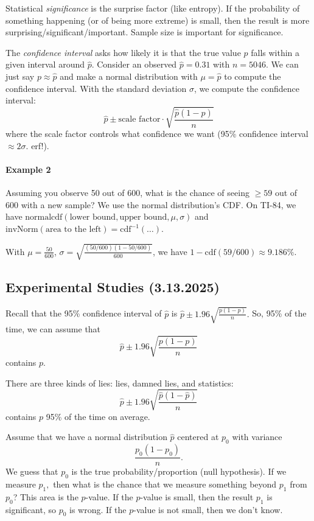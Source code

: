 \documentclass[12pt]{article}
\theoremstyle{remark}
\begin{document}
Statistical \emph{significance} is the surprise factor (like entropy). If the probability of something happening (or of being more extreme) is small, then the result is more surprising/significant/important. Sample size is important for significance.

The \emph{confidence interval} asks how likely it is that the true value $p$ falls within a given interval around $\hat p$. Consider an observed $\hat p = 0.31$ with $n=5046$. We can just say $p\approx \hat p$ and make a normal distribution with $\mu = \hat p$ to compute the confidence interval. With the standard deviation $\sigma$, we compute the confidence interval:
\[\hat p \pm \text{scale factor} \cdot \sqrt{\frac{\hat p (1 - \hat p )}{n}}\]
where the scale factor controls what confidence we want (95\% confidence interval $\approx 2\sigma$. erf!).


\paragraph{Example 2}
Assuming you observe 50 out of 600, what is the chance of seeing $\ge 59$ out of 600 with a new sample? We use the normal distribution's CDF. On TI-84, we have $\text{normalcdf}(\text{lower bound}, \text{upper bound}, \mu, \sigma)$ and $\text{invNorm}(\text{area to the left}) = \text{cdf}^{-1}(\dots)$.

With $\mu = \frac{50}{600}$, $\sigma = \sqrt{\frac{(50/600)(1-50/600)}{600}}$, we have $1-\text{cdf}(59/600) \approx \boxed{9.186\%}$.


\subsection{Experimental Studies (3.13.2025)}
Recall that the 95\% confidence interval of $\hat{p}$ is $\hat p\pm1.96\sqrt{\frac{p(1-p)}{n}}.$ So, 95\% of the time, we can assume that
\[\hat{p}\pm1.96\sqrt{\frac{p(1-p)}{n}}\] contains $p.$ 


There are three kinds of lies: lies, damned lies, and statistics:
\[\hat{p}\pm1.96\sqrt{\frac{\hat{p}(1-\hat{p})}{n}}\] contains $p$ 95\% of the time on average.

Assume that we have a normal distribution $\hat p$ centered at $p_0$ with variance
\[\frac{p_0(1-p_0)}{n}.\] We guess that $p_0$ is the true probability/proportion (null hypothesis). If we measure $p_1,$ then what is the chance that we measure something beyond $p_1$ from $p_0$? This area is the $p$-value. If the $p$-value is small, then the result $p_1$ is significant, so $p_0$ is wrong. If the $p$-value is not small, then we don't know.
\end{document}
